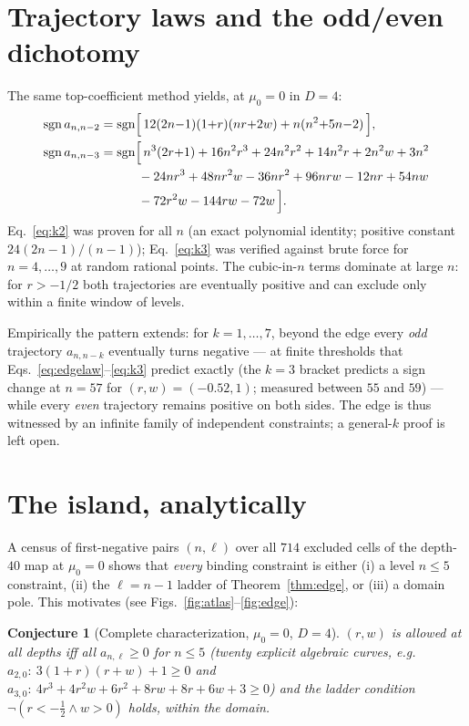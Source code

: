 \documentclass[11pt]{article}
\newtheorem{conjecture}{Conjecture}
\newcommand{\sgn}{\operatorname{sgn}}
\begin{document}
\section{Trajectory laws and the odd/even dichotomy}

The same top-coefficient method yields, at $\mu_0=0$ in $D=4$:
\begin{align}
\sgn a_{n,n-2} &= \sgn\Bigl[\,12(2n{-}1)(1{+}r)(nr{+}2w)+n(n^2{+}5n{-}2)\,\Bigr],
\label{eq:k2}\\
\sgn a_{n,n-3} &= \sgn\Bigl[\,n^3(2r{+}1)+16n^2r^3+24n^2r^2+14n^2r+2n^2w+3n^2
\nonumber\\
&\qquad\quad -24nr^3+48nr^2w-36nr^2+96nrw-12nr+54nw
\nonumber\\
&\qquad\quad -72r^2w-144rw-72w\,\Bigr].
\label{eq:k3}
\end{align}
Eq.~\eqref{eq:k2} was proven for all $n$ (an exact polynomial identity;
positive constant $24(2n-1)/(n-1)$); Eq.~\eqref{eq:k3} was verified against
brute force for $n=4,\dots,9$ at random rational points. The cubic-in-$n$
terms dominate at large $n$: for $r>-1/2$ both trajectories are eventually
positive and can exclude only within a finite window of levels.

Empirically the pattern extends: for $k=1,\dots,7$, beyond the edge every
\emph{odd} trajectory $a_{n,n-k}$ eventually turns negative --- at finite
thresholds that Eqs.~\eqref{eq:edgelaw}--\eqref{eq:k3} predict exactly (the
$k=3$ bracket predicts a sign change at $n=57$ for $(r,w)=(-0.52,1)$;
measured between $55$ and $59$) --- while every \emph{even} trajectory remains
positive on both sides. The edge is thus witnessed by an infinite family of
independent constraints; a general-$k$ proof is left open.

\section{The island, analytically}\label{sec:island}

A census of first-negative pairs $(n,\ell)$ over all $714$ excluded cells of
the depth-$40$ map at $\mu_0=0$ shows that \emph{every} binding constraint is
either (i) a level $n\le 5$ constraint, (ii) the $\ell=n-1$ ladder of
Theorem~\ref{thm:edge}, or (iii) a domain pole. This motivates (see Figs.~\ref{fig:atlas}--\ref{fig:edge}):

\begin{conjecture}[Complete characterization, $\mu_0=0$, $D=4$]\label{conj:complete}
$(r,w)$ is allowed at all depths iff all $a_{n,\ell}\ge 0$ for $n\le 5$
(twenty explicit algebraic curves, e.g.\ $a_{2,0}\!:~3(1+r)(r+w)+1\ge 0$ and
$a_{3,0}\!:~4r^3+4r^2w+6r^2+8rw+8r+6w+3\ge 0$) and the ladder condition
$\neg(r<-\tfrac12 \wedge w>0)$ holds, within the domain.
\end{conjecture}
\end{document}
